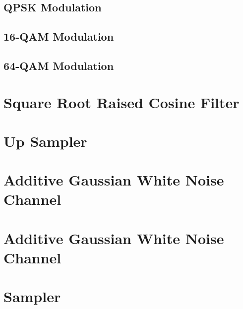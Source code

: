 \documentclass[]{article}
\begin{document}

\cleardoublepage  %
\newpage

\subsection{QPSK Modulation}
\label{app:qpsk_mod}

\cleardoublepage  %
\newpage

\subsection{16-QAM Modulation}
\label{app:qam_16_mod}


\cleardoublepage  %
\newpage

\subsection{64-QAM Modulation }
\label{app:qam_64_mod}

\cleardoublepage  %
\newpage

\section{Square Root Raised Cosine Filter}
\label{app:sqrt_raised_cosine}

\cleardoublepage
\newpage

\section{Up Sampler}
\label{app:impulse_train}

\cleardoublepage
\newpage

\section{Additive Gaussian White Noise Channel}
\label{app:awgn_channel}

\cleardoublepage
\newpage

\section{Additive Gaussian White Noise Channel}
\label{app:awgn_channel}

\cleardoublepage
\newpage

\section{Sampler}
\label{app:sampler}

\cleardoublepage
\newpage
\end{document}
